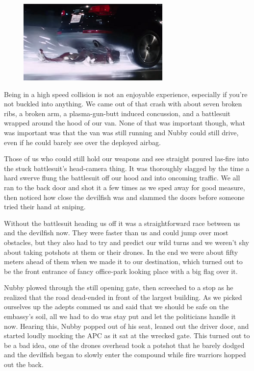 \begin{figure}
	\begin{center}
		\includegraphics[width=\figwidth]{pics/10/71.png}
	\end{center}
\end{figure}
Being in a high speed collision is not an enjoyable experience, especially if you're not buckled into anything. 
We came out of that crash with about seven broken ribs, a broken arm, a plasma-gun-butt induced concussion, and a battlesuit wrapped around the hood of our van. 
None of that was important though, what was important was that the van was still running and Nubby could still drive, even if he could barely see over the deployed airbag.

Those of us who could still hold our weapons and see straight poured las-fire into the stuck battlesuit's head-camera thing. 
It was thoroughly slagged by the time a hard swerve flung the battlesuit off our hood and into oncoming traffic. 
We all ran to the back door and shot it a few times as we sped away for good measure, then noticed how close the devilfish was and slammed the doors before someone tried their hand at sniping.

Without the battlesuit heading us off it was a straightforward race between us and the devilfish now. 
They were faster than us and could jump over most obstacles, but they also had to try and predict our wild turns and we weren't shy about taking potshots at them or their drones. 
In the end we were about fifty meters ahead of them when we made it to our destination, which turned out to be the front entrance of fancy office-park looking place with a big flag over it.

Nubby plowed through the still opening gate, then screeched to a stop as he realized that the road dead-ended in front of the largest building. 
As we picked ourselves up the adepts commed us and said that we should be safe on the embassy's soil, all we had to do was stay put and let the politicians handle it now. 
Hearing this, Nubby popped out of his seat, leaned out the driver door, and started loudly mocking the APC as it sat at the wrecked gate. 
This turned out to be a bad idea, one of the drones overhead took a potshot that he barely dodged and the devilfish began to slowly enter the compound while fire warriors hopped out the back.

